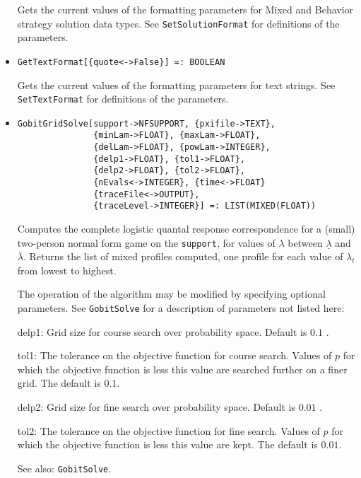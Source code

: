 \begin{itemize}
\bd
Gets the current values of the formatting parameters for Mixed and
Behavior strategy solution data types.  See \verb+SetSolutionFormat+ for
definitions of the parameters.  
\ed

\item{}
\protect \large \begin{verbatim}
GetTextFormat[{quote<->False}] =: BOOLEAN 
\end{verbatim} \normalsize

\bd
Gets the current values of the formatting parameters for text strings.  See
\verb+SetTextFormat+ for definitions of the parameters. 
\ed

\item{}
\protect \large \begin{verbatim}
GobitGridSolve[support->NFSUPPORT, {pxifile->TEXT},
               {minLam->FLOAT}, {maxLam->FLOAT}, 
               {delLam->FLOAT}, {powLam->INTEGER}, 
               {delp1->FLOAT}, {tol1->FLOAT},
               {delp2->FLOAT}, {tol2->FLOAT},
               {nEvals<->INTEGER}, {time<->FLOAT}
               {traceFile<->OUTPUT},
               {traceLevel->INTEGER}] =: LIST(MIXED(FLOAT))
\end{verbatim}\normalsize

\bd
Computes the complete logistic quantal response correspondence for
a (small) two-person normal form game on the \verb+support+, for values of
$\lambda$ between $\underline{\lambda}$ and $\bar{\lambda}.$ Returns
the list of mixed profiles computed, one profile for each value of
$\lambda_t$ from lowest to highest.

The operation of the algorithm may be modified by specifying optional
parameters.  See \verb+GobitSolve+ for a description of parameters
not listed here:
\bd
\item
[delp1:] Grid size for course search over probability space.  Default
is $0.1$ .
\item
[tol1:] The tolerance on the objective function for course search.
Values of $p$ for which the objective function is less this value are
searched further on a finer grid.  The default is $0.1$.
\item
[delp2:] Grid size for fine search over probability space.  Default is
$0.01$ .
\item
[tol2:] The tolerance on the objective function for fine search.
Values of $p$ for which the objective function is less this value are
kept.  The default is $0.01$.  
\ed
\item [See also:] \verb+GobitSolve+.
\ed


\end{itemize}
